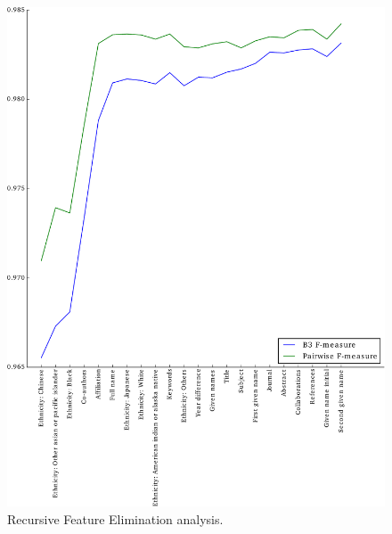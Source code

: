 \documentclass{article}
\begin{document}
\begin{figure}
\centering
\caption{Recursive Feature Elimination analysis. }
\label{fig:rfe}
\includegraphics[width=\textwidth]{figures/rfe.pdf}
\end{figure}
\end{document}
